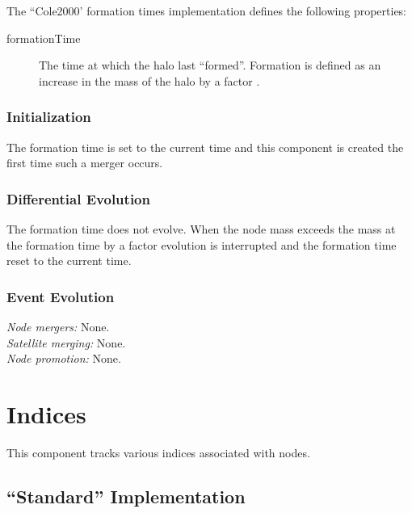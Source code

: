 The ``Cole2000' formation times implementation defines the following properties:
\begin{description}
 \item [{\normalfont \ttfamily formationTime}] The time at which the halo last ``formed''. Formation is defined as an increase in the mass of the halo by a factor {\normalfont \ttfamily [haloReformationMassFactor]}.
\end{description}

\subsubsection{Initialization}

The formation time is set to the current time and this \gls{component} is created the first time such a merger occurs.

\subsubsection{Differential Evolution}

The formation time does not evolve. When the \gls{node} mass exceeds the mass at the formation time by a factor {\normalfont \ttfamily [haloReformationMassFactor]} evolution is interrupted and the formation time reset to the current time.

\subsubsection{Event Evolution}

\noindent\emph{Node mergers:} None.\\

\noindent\emph{Satellite merging:} None.\\

\noindent\emph{Node promotion:} None.\\

\section{Indices}\label{sec:ComponentIndices}

This \gls{component} tracks various indices associated with nodes.

\subsection{``Standard'' Implementation}

